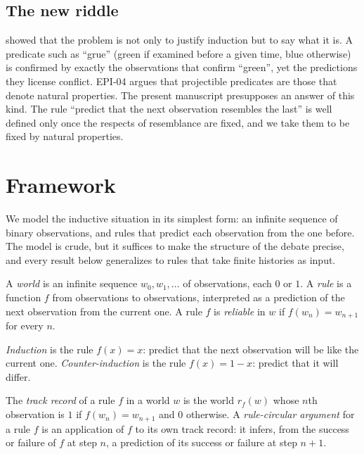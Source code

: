 \documentclass{situationist-preprint}
\begin{document}
\subsection{The new riddle}

\citet{Goodman1955} showed that the problem is not only to justify induction but to say what it is. A predicate such as \enquote{grue} (green if examined before a given time, blue otherwise) is confirmed by exactly the observations that confirm \enquote{green}, yet the predictions they license conflict. EPI-04 argues that projectible predicates are those that denote natural properties. The present manuscript presupposes an answer of this kind. The rule \enquote{predict that the next observation resembles the last} is well defined only once the respects of resemblance are fixed, and we take them to be fixed by natural properties.

\section{Framework}\label{s:frame}

We model the inductive situation in its simplest form: an infinite sequence of binary observations, and rules that predict each observation from the one before. The model is crude, but it suffices to make the structure of the debate precise, and every result below generalizes to rules that take finite histories as input.

\begin{definition}\label{d:reliable}
A \emph{world} is an infinite sequence $w_0, w_1, \ldots$ of observations, each $0$ or $1$. A \emph{rule} is a function $f$ from observations to observations, interpreted as a prediction of the next observation from the current one. A rule $f$ is \emph{reliable} in $w$ if $f(w_n) = w_{n+1}$ for every $n$.
\end{definition}

\begin{definition}\label{d:rules}
\emph{Induction} is the rule $f(x) = x$: predict that the next observation will be like the current one. \emph{Counter-induction} is the rule $f(x) = 1 - x$: predict that it will differ.
\end{definition}

\begin{definition}\label{d:record}
The \emph{track record} of a rule $f$ in a world $w$ is the world $r_f(w)$ whose $n$th observation is $1$ if $f(w_n) = w_{n+1}$ and $0$ otherwise. A \emph{rule-circular argument} for a rule $f$ is an application of $f$ to its own track record: it infers, from the success or failure of $f$ at step $n$, a prediction of its success or failure at step $n+1$.
\end{definition}
\end{document}
